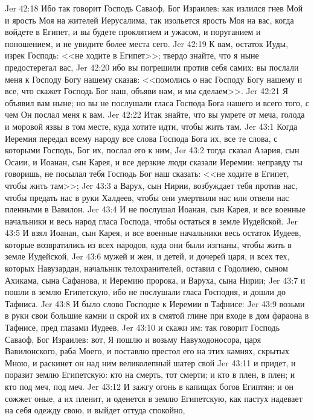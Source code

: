 \vs Jer 42:18 Ибо так говорит Господь Саваоф, Бог Израилев: как излился гнев Мой и ярость Моя на жителей Иерусалима, так изольется ярость Моя на вас, когда войдете в Египет, и вы будете проклятием и ужасом, и поруганием и поношением, и не увидите более места сего.
\vs Jer 42:19 К вам, остаток Иуды, изрек Господь: <<не ходите в Египет>>; твердо знайте, что я ныне предостерегал вас,
\vs Jer 42:20 ибо вы погрешили против себя самих: вы послали меня к Господу Богу нашему сказав: <<помолись о нас Господу Богу нашему и все, что скажет Господь Бог наш, объяви нам, и мы сделаем>>.
\vs Jer 42:21 Я объявил вам ныне; но вы не послушали гласа Господа Бога нашего и всего того, с чем Он послал меня к вам.
\vs Jer 42:22 Итак знайте, что вы умрете от меча, голода и моровой язвы в том месте, куда хотите идти, чтобы жить там.
\vs Jer 43:1 Когда Иеремия передал всему народу все слова Господа Бога их, все те слова, с которыми Господь, Бог их, послал его к ним,
\vs Jer 43:2 тогда сказал Азария, сын Осаии, и Иоанан, сын Карея, и все дерзкие люди сказали Иеремии: неправду ты говоришь, не посылал тебя Господь Бог наш сказать: <<не ходите в Египет, чтобы жить там>>;
\vs Jer 43:3 а Варух, сын Нирии, возбуждает тебя против нас, чтобы предать нас в руки Халдеев, чтобы они умертвили нас или отвели нас пленными в Вавилон.
\vs Jer 43:4 И не послушал Иоанан, сын Карея, и все военные начальники и весь народ гласа Господа, чтобы остаться в земле Иудейской.
\vs Jer 43:5 И взял Иоанан, сын Карея, и все военные начальники весь остаток Иудеев, которые возвратились из всех народов, куда они были изгнаны, чтобы жить в земле Иудейской,
\vs Jer 43:6 мужей и жен, и детей, и дочерей царя, и всех тех, которых Навузардан, начальник телохранителей, оставил с Годолиею, сыном Ахикама, сына Сафанова, и Иеремию пророка, и Варуха, сына Нирии;
\vs Jer 43:7 и пошли в землю Египетскую, ибо не послушали гласа Господня, и дошли до Тафниса.
\rsbpar\vs Jer 43:8 И было слово Господне к Иеремии в Тафнисе:
\vs Jer 43:9 возьми в руки свои большие камни и скрой их в смятой глине при входе в дом фараона в Тафнисе, пред глазами Иудеев,
\vs Jer 43:10 и скажи им: так говорит Господь Саваоф, Бог Израилев: вот, Я пошлю и возьму Навуходоносора, царя Вавилонского, раба Моего, и поставлю престол его на этих камнях, скрытых Мною, и раскинет он над ним великолепный шатер свой
\vs Jer 43:11 и придет, и поразит землю Египетскую: кто  на смерть, тот  смерти; и кто в плен,  в плен; и кто под меч, под меч.
\vs Jer 43:12 И зажгу огонь в капищах богов Египтян; и он сожжет оные, а их пленит, и оденется в землю Египетскую, как пастух надевает на себя одежду свою, и выйдет оттуда спокойно,
